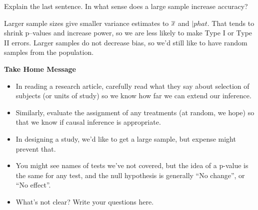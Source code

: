 \begin{enumerate}
Explain the last sentence.  In what sense does a large sample increase accuracy?

\begin{students}
 \vspace{4cm}
\end{students}

\begin{key}
   Larger sample sizes give smaller variance estimates to $\overline{x}$ and
   $|phat$.  That tends to shrink p--values and increase power, so we
   are less likely to make Type I or Type II errors. Larger samples do
   not decrease bias, so we'd still like to have random samples from
   the population.
\end{key}


\end{enumerate}


\begin{center}
  {\large\bf Take Home Message}
\end{center}

\begin{itemize}
\item  In reading a research article, carefully read what they say
  about selection of subjects (or units of study) so we know how far
  we can extend our inference.
\item Similarly, evaluate the assignment of any treatments (at random,
  we hope) so that we know if causal inference is appropriate.
\item In designing a study, we'd like to get a large sample, but
  expense might prevent that.
\item You might see names of tests we've not covered, but the idea of
  a p-value is the same for any test, and the null hypothesis is
  generally ``No change'', or ``No effect''.
\item What's not clear?  Write your questions here.
\end{itemize}


